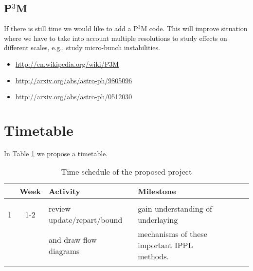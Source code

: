 \documentclass[10pt,a4paper]{scrartcl}
\begin{document}
\subsection{P$^3$M}

If there is still time we would like to add a P$^3$M code. This will improve
situation where we have to take into account multiple resolutions to study
effects on different scales, e.g., study micro-bunch instabilities.

\begin{itemize}
    \item \url{http://en.wikipedia.org/wiki/P3M}
    \item \url{http://arxiv.org/abs/astro-ph/9805096}
    \item \url{http://arxiv.org/abs/astro-ph/0512030}
\end{itemize}




\section{Timetable}

In Table \ref{tbl:time} we propose a timetable.

\begin{table}[ht]\footnotesize
\begin{center}  
\begin{tabular}{lclllll} 
\hline 
\bf & \bf Week  & \bf Activity & \bf Milestone  \\
\hline \\
1 & 1-2 & review update/repart/bound  & gain understanding of underlaying \\
  &     & and draw flow diagrams      & mechanisms of these important IPPL methods. \\
\\
\hline 
\end{tabular} 
\caption{Time schedule of the proposed project}
\label{tbl:time}
\end{center}
\end{table}
\end{document}

